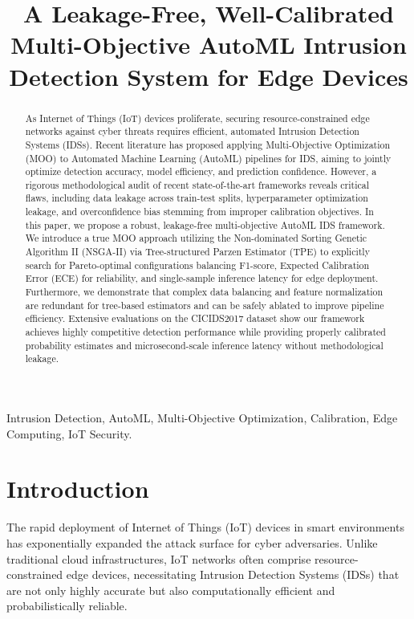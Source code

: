\documentclass[journal, twocolumn]{IEEEtran}
\begin{document}
\title{A Leakage-Free, Well-Calibrated Multi-Objective AutoML Intrusion Detection System for Edge Devices}

\author{
}

\maketitle

\begin{abstract}
As Internet of Things (IoT) devices proliferate, securing resource-constrained edge networks against cyber threats requires efficient, automated Intrusion Detection Systems (IDSs). Recent literature has proposed applying Multi-Objective Optimization (MOO) to Automated Machine Learning (AutoML) pipelines for IDS, aiming to jointly optimize detection accuracy, model efficiency, and prediction confidence. However, a rigorous methodological audit of recent state-of-the-art frameworks reveals critical flaws, including data leakage across train-test splits, hyperparameter optimization leakage, and overconfidence bias stemming from improper calibration objectives. In this paper, we propose a robust, leakage-free multi-objective AutoML IDS framework. We introduce a true MOO approach utilizing the Non-dominated Sorting Genetic Algorithm II (NSGA-II) via Tree-structured Parzen Estimator (TPE) to explicitly search for Pareto-optimal configurations balancing F1-score, Expected Calibration Error (ECE) for reliability, and single-sample inference latency for edge deployment. Furthermore, we demonstrate that complex data balancing and feature normalization are redundant for tree-based estimators and can be safely ablated to improve pipeline efficiency. Extensive evaluations on the CICIDS2017 dataset show our framework achieves highly competitive detection performance while providing properly calibrated probability estimates and microsecond-scale inference latency without methodological leakage.
\end{abstract}

\begin{IEEEkeywords}
Intrusion Detection, AutoML, Multi-Objective Optimization, Calibration, Edge Computing, IoT Security.
\end{IEEEkeywords}

\section{Introduction}
The rapid deployment of Internet of Things (IoT) devices in smart environments has exponentially expanded the attack surface for cyber adversaries. Unlike traditional cloud infrastructures, IoT networks often comprise resource-constrained edge devices, necessitating Intrusion Detection Systems (IDSs) that are not only highly accurate but also computationally efficient and probabilistically reliable.
\end{document}
